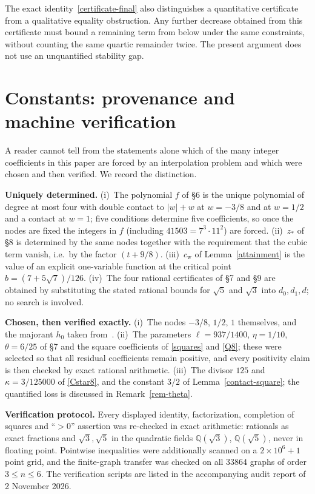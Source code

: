 \documentclass[11pt]{article}
\theoremstyle{remark}\newtheorem{remark}[theorem]{Remark}
\newcommand{\cstar}{c_{\mathrm{w}}}
\numberwithin{equation}{section}
\begin{document}
The exact identity~\eqref{certificate-final} also distinguishes a
quantitative certificate from a qualitative equality obstruction. Any
further decrease obtained from this certificate must bound a remaining term from below
under the same constraints, without counting the same quartic remainder
twice. The present argument does not use an unquantified stability gap.

\appendix
\section{Constants: provenance and machine verification}\label{sec-appendix}

A reader cannot tell from the statements alone which of the many integer
coefficients in this paper are forced by an interpolation problem and which
were chosen and then verified. We record the distinction.

\textbf{Uniquely determined.}
(i)~The polynomial $f$ of \S6 is the unique polynomial of degree at most
four with double contact to $|w|+w$ at $w=-3/8$ and at $w=1/2$ and a contact
at $w=1$; five conditions determine five coefficients, so once the nodes are
fixed the integers in $f$ (including $41503=7^3\cdot11^2$) are forced.
(ii)~$z_*$ of \S8 is determined by the same nodes together with the
requirement that the cubic term vanish, i.e.\ by the factor $(t+9/8)$.
(iii)~$\cstar$ of Lemma~\ref{attainment} is the value of an explicit
one-variable function at the critical point $b=(7+5\sqrt7)/126$.
(iv)~The four rational certificates of \S7 and \S9 are obtained by
substituting the stated rational bounds for $\sqrt5$ and $\sqrt3$ into
$d_0,d_1,d$; no search is involved.

\textbf{Chosen, then verified exactly.}
(i)~The nodes $-3/8,\,1/2,\,1$ themselves, and the majorant $h_0$ taken
from~\cite[Lemma 4.4]{STW}.
(ii)~The parameters $\ell=937/1400$, $\eta=1/10$, $\theta=6/25$ of \S7 and
the square coefficients of \eqref{squares} and \eqref{Q8}; these were
selected so that all residual coefficients remain positive, and every
positivity claim is then checked by exact rational arithmetic.
(iii)~The divisor $125$ and $\kappa=3/125000$ of \eqref{Cstar8}, and the
constant $3/2$ of Lemma~\ref{contact-square}; the quantified loss is
discussed in Remark~\ref{rem-theta}.

\textbf{Verification protocol.} Every displayed identity, factorization,
completion of squares and ``$>0$'' assertion was re-checked in exact
arithmetic: rationals as exact fractions and $\sqrt3,\sqrt5$ in the
quadratic fields $\mathbb Q(\sqrt3)$, $\mathbb Q(\sqrt5)$, never in floating
point. Pointwise inequalities were additionally scanned on a
$2\times10^6+1$ point grid, and the finite-graph transfer was checked on all
$33864$ graphs of order $3\le n\le6$. The verification scripts are listed in
the accompanying audit report of 2 November 2026.
\end{document}
